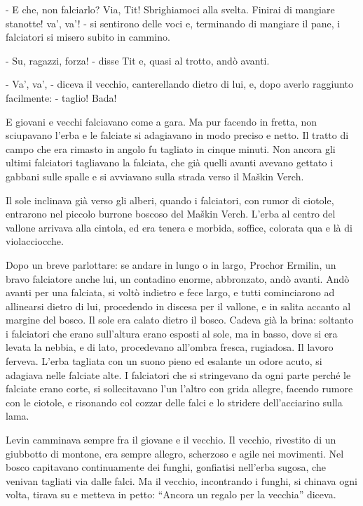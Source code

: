 - E che, non falciarlo? Via, Tit! Sbrighiamoci alla svelta. Finirai di mangiare stanotte! va', va'! - si sentirono delle voci e, terminando di mangiare il pane, i falciatori si misero subito in cammino. 

- Su, ragazzi, forza! - disse Tit e, quasi al trotto, andò avanti. 

- Va', va', - diceva il vecchio, canterellando dietro di lui, e, dopo averlo raggiunto facilmente: - taglio! Bada! 

E giovani e vecchi falciavano come a gara. Ma pur facendo in fretta, non sciupavano l'erba e le falciate si adagiavano in modo preciso e netto. Il tratto di campo che era rimasto in angolo fu tagliato in cinque minuti. Non ancora gli ultimi falciatori tagliavano la falciata, che già quelli avanti avevano gettato i gabbani sulle spalle e si avviavano sulla strada verso il Maškin Verch. 

Il sole inclinava già verso gli alberi, quando i falciatori, con rumor di ciotole, entrarono nel piccolo burrone boscoso del Maškin Verch. L'erba al centro del vallone arrivava alla cintola, ed era tenera e morbida, soffice, colorata qua e là di violacciocche. 

Dopo un breve parlottare: se andare in lungo o in largo, Prochor Ermilin, un bravo falciatore anche lui, un contadino enorme, abbronzato, andò avanti. Andò avanti per una falciata, si voltò indietro e fece largo, e tutti cominciarono ad allinearsi dietro di lui, procedendo in discesa per il vallone, e in salita accanto al margine del bosco. Il sole era calato dietro il bosco. Cadeva già la brina: soltanto i falciatori che erano sull'altura erano esposti al sole, ma in basso, dove si era levata la nebbia, e di lato, procedevano all'ombra fresca, rugiadosa. Il lavoro ferveva. L'erba tagliata con un suono pieno ed esalante un odore acuto, si adagiava nelle falciate alte. I falciatori che si stringevano da ogni parte perché le falciate erano corte, si sollecitavano l'un l'altro con grida allegre, facendo rumore con le ciotole, e risonando col cozzar delle falci e lo stridere dell'acciarino sulla lama. 

Levin camminava sempre fra il giovane e il vecchio. Il vecchio, rivestito di un giubbotto di montone, era sempre allegro, scherzoso e agile nei movimenti. Nel bosco capitavano continuamente dei funghi, gonfiatisi nell'erba sugosa, che venivan tagliati via dalle falci. Ma il vecchio, incontrando i funghi, si chinava ogni volta, tirava su e metteva in petto: ``Ancora un regalo per la vecchia'' diceva. 

